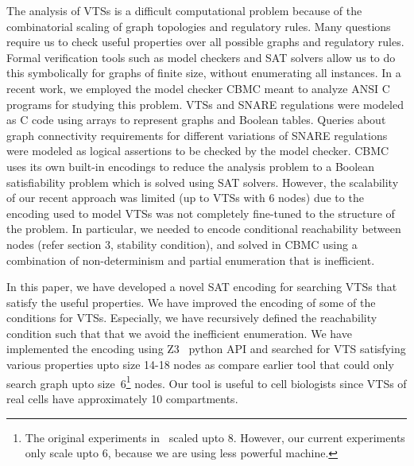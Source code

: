 The analysis of VTSs is a difficult computational problem because of the combinatorial scaling of graph topologies and regulatory rules. Many questions require us to check useful properties over all possible graphs and regulatory rules. Formal verification tools such as model checkers \cite{clarke1996symbolic, biere2003bounded, clarke2008birth, cimatti2000nusmv, holzmann1997model} and SAT solvers \cite{moskewicz2001chaff,een2004extensible} allow us to do this symbolically for graphs of finite size, without enumerating all instances. In a recent work, we employed the model checker CBMC \cite{CKY03, ckl2004} meant to analyze ANSI C programs for studying this problem. VTSs and SNARE regulations were modeled as C code using arrays to represent graphs and Boolean tables. Queries about graph connectivity requirements for different variations of SNARE regulations were modeled as logical assertions to be checked by the model checker. CBMC uses its own built-in encodings to reduce the analysis problem to a Boolean satisfiability problem which is solved using SAT solvers.
%
However, the scalability of our recent approach was limited (up to
VTSs with 6 nodes) due to the encoding used to model VTSs was not completely
fine-tuned to the structure of the problem.
%
In particular, we needed to encode conditional reachability between
nodes (refer section 3, stability condition), and solved in CBMC using a
combination of non-determinism and partial enumeration that is
inefficient.



In this paper, we have developed a novel SAT encoding for
searching VTSs that satisfy the useful properties.
%
We have improved the encoding of some of the conditions for VTSs.
%
Especially, we have recursively defined the reachability condition
such that that we avoid the inefficient enumeration.
%
%
%
We have implemented the encoding using Z3~\cite{z3} python API and
searched for VTS satisfying various properties upto size 14-18 nodes
as compare earlier tool that could only search graph upto
size~6\footnote{The original experiments in~\cite{shukla} scaled upto 8.
However, our current experiments only scale upto 6, because
we are using less powerful machine.} nodes.
%
Our tool is useful to cell biologists since VTSs of real cells have
approximately 10 compartments.

